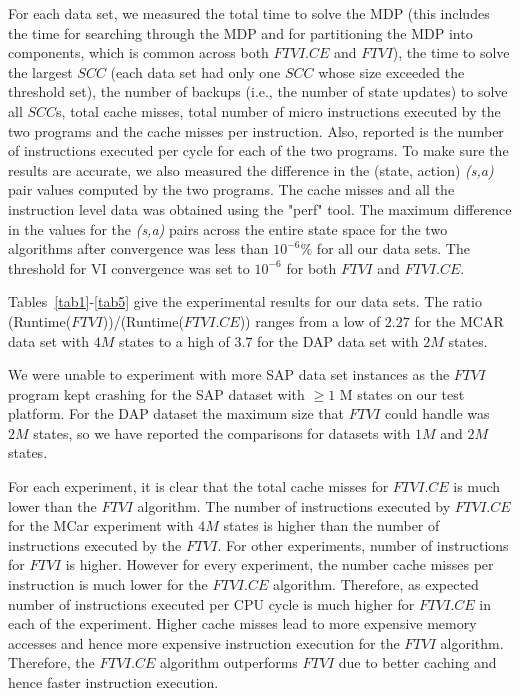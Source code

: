 \documentclass[conference]{IEEEtran}
\begin{document}
For each data set, we measured the total time to solve the MDP (this includes the time for searching through the MDP and for partitioning the MDP into components, which is common across both \textit{$FTVI.CE$} and \textit{$FTVI$}),
the time to solve the largest $SCC$ (each data set had only one $SCC$ whose size exceeded the threshold set), the number of backups (i.e., the number of state updates) to solve all $SCC$s, total cache misses, total number of micro instructions executed by the two programs and the cache misses per instruction. Also, reported is the number of instructions executed per cycle for each of the two programs. To make sure the results are accurate, we also measured the difference in the (state, action) \textit{(s,a)} pair values computed by the two programs.
The cache misses and all the instruction level data was obtained using the "perf" \cite{perf} tool.
The maximum difference in the values for the \textit{(s,a)} pairs across the entire state space for the two algorithms after convergence was less than $10^{-6}\%$ for all our data sets. The threshold for VI convergence was set to $10^{-6}$ for both $FTVI$ and $FTVI.CE$.

Tables~\ref{tab1}-\ref{tab5} give the experimental results for our data sets. The ratio (Runtime($FTVI$))/(Runtime($FTVI.CE$)) ranges from a low of $2.27$ for the MCAR data set with $4M$ states to a high of $3.7$ for the DAP data set with $2M$ states.

We were unable to experiment with more SAP data set instances as the $FTVI$ program kept crashing for the SAP dataset with $\ge1$ M states  on our test platform. For the DAP dataset the maximum size that $FTVI$ could handle was $2M$ states, so we have reported the comparisons for datasets with $1M$ and $2M$ states.

For each experiment, it is clear that the total cache misses for $FTVI.CE$ is much lower than the $FTVI$ algorithm. The number of instructions executed by $FTVI.CE$ for the MCar experiment with $4M$ states is higher than the number of instructions executed by the $FTVI$. For other experiments, number of instructions for $FTVI$ is higher. However for every experiment, the number cache misses per instruction is much lower for the $FTVI.CE$ algorithm. Therefore, as expected number of instructions executed per CPU cycle is much higher for $FTVI.CE$ in each of the experiment. Higher cache misses lead to more expensive memory accesses and hence more expensive instruction execution for the $FTVI$ algorithm. Therefore, the $FTVI.CE$ algorithm outperforms $FTVI$ due to better caching and hence faster instruction execution.
\end{document}

